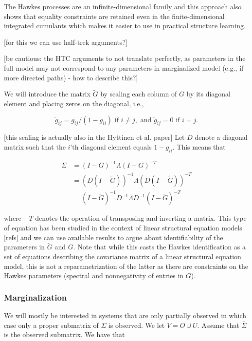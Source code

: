 \documentclass[accepted]{uai2021} %
\begin{document}
The Hawkes processes are an infinite-dimensional family and this approach also 
shows that equality constraints are retained even in the finite-dimensional 
integrated cumulants which makes it easier to use in practical structure 
learning.

[for this we can use half-trek arguments?]

[be cautious: the HTC arguments to not translate perfectly, as parameters in 
the full model may not correspond to any parameters in marginalized model 
(e.g., if more directed paths) - how to describe this?]

We will introduce the matrix $\tilde{G}$ by scaling each column of $G$ by its 
diagonal element and placing zeros on the diagonal, i.e.,

$$
\tilde{g}_{ij} = g_{ij}/(1-g_{ii})  \text{ if } i\neq j, \text{ and } 
\tilde{g}_{ij} 
= 0 \text{ if } i= j.
$$

[this scaling is actually also in the Hyttinen et al. paper] Let $D$ denote a 
diagonal matrix such that the $i$'th diagonal element equals 
$1 - g_{ii}$. This means that 

\begin{align*}
\Sigma & = (I - G)^{-1}\Lambda (I - G)^{-T}  \\
& = (D(I - \tilde{G}))^{-1}\Lambda (D(I - \tilde{G}))^{-T} \\
& = (I - \tilde{G})^{-1}D^{-1} \Lambda D^{-1}(I - 
\tilde{G})^{-T}
\end{align*}



where $-T$ denotes the operation of transposing and inverting a matrix. This 
type of equation has been studied in the context of linear structural 
equation models [refs] and we can use available results to argue about 
identifiability of the parameters in $\tilde{G}$ and $G$. Note that while this 
casts the Hawkes identification as a set of equations describing the covariance 
matrix of a linear structural equation model, this is not a reparametrization 
of the latter as there are constraints on the Hawkes parameters (spectral 
and nonnegativity of entries in $G$).


\subsubsection{Marginalization}

We will mostly be interested in systems that are only partially observed in 
which case only a proper submatrix of $\Sigma$ is observed. We let $V = O \cup 
U$. Assume that $\bar{\Sigma}$ is the observed submatrix. We have 
that 
\end{document}
